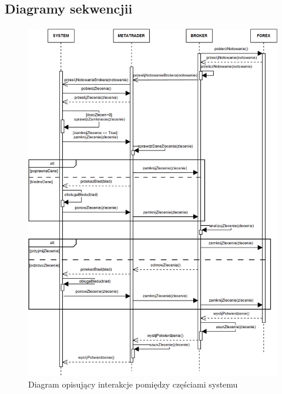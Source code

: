 \documentclass[pdflatex,11pt]{aghdpl}
\begin{document}
\subsection{Diagramy sekwencjii}
\paragraph{}

\begin{figure}[H]
\begin{center}
\includegraphics[width=16cm]{sekwencji.png}
\caption{Diagram opisujący interakcje pomiędzy częściami systemu}
\label{sekwencji}
\end{center}
\end{figure} 
\end{document}
